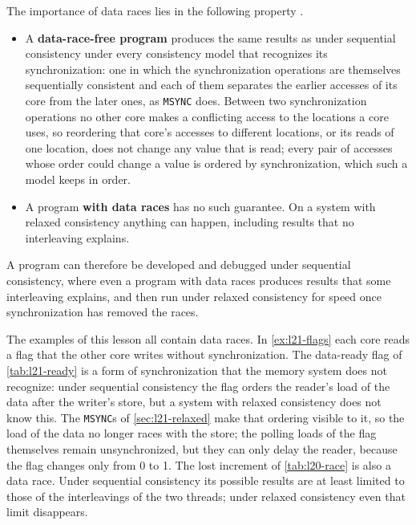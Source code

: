 \documentclass[../main.tex]{subfiles}
\begin{document}
The importance of data races lies in the following property
\cite{adve1990}.
\begin{itemize}
  \item A \textbf{data-race-free program} produces the same results as under
    sequential consistency under every consistency model that recognizes its
    synchronization: one in which the synchronization operations are
    themselves sequentially consistent and each of them separates the earlier
    accesses of its core from the later ones, as \texttt{MSYNC} does.
    Between two synchronization operations no other core makes a
    conflicting access to the locations a core uses, so reordering that
    core's accesses to different locations, or its reads of one location,
    does not change any value that is read; every pair of accesses whose
    order could change a value is ordered by synchronization, which such a
    model keeps in order.
  \item A program \textbf{with data races} has no such guarantee.  On a system
    with relaxed consistency anything can happen, including results that no
    interleaving explains.
\end{itemize}

A program can therefore be developed and debugged under sequential
consistency, where even a program with data races produces results that some
interleaving explains, and then run under relaxed consistency for speed once
synchronization has removed the races.

The examples of this lesson all contain data races.  In
\cref{ex:l21-flags} each core reads a flag that the other core writes without
synchronization.  The data-ready flag of \cref{tab:l21-ready} is a form of
synchronization that the memory system does not recognize: under sequential
consistency the flag orders the reader's load of the data after the writer's
store, but a system with relaxed consistency does not know this.  The
\texttt{MSYNC}s of \cref{sec:l21-relaxed} make that ordering visible to it, so
the load of the data no longer races with the store; the polling loads of the
flag themselves remain unsynchronized, but they can only delay the reader,
because the flag changes only from 0 to 1.  The lost increment of
\cref{tab:l20-race} is also a data race.  Under sequential consistency its
possible results are at least limited to those of the interleavings of the two
threads; under relaxed consistency even that limit disappears.
\end{document}
